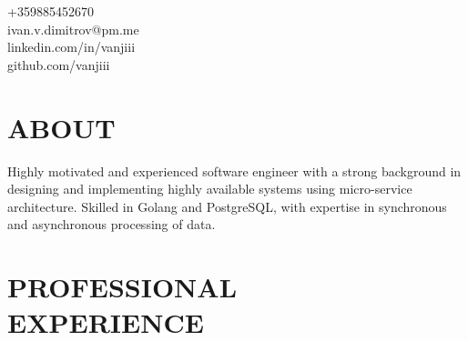 \documentclass[margin,line]{resume}
\begin{document}
{
    \hfill +359885452670				\vspace{0mm}\\\vspace{0mm}%
    \hfill ivan.v.dimitrov@pm.me		\vspace{0mm}\\\vspace{0mm}%
    \hfill linkedin.com/in/vanjiii		\vspace{0mm}\\\vspace{0mm}%
    \hfill github.com/vanjiii			\vspace{0mm}\\\vspace{-10mm}%
}

\begin{resume}

\section{\mysidestyle\textbf{\large{A}\small{BOUT}}}

	Highly motivated and experienced software engineer with a strong background
	in designing and implementing highly available systems using micro-service
	architecture. Skilled in Golang and PostgreSQL, with expertise in
	synchronous and asynchronous processing of data.

\sectionline%

    \section{\mysidestyle\textbf{\large{P}\small{ROFESSIONAL\\EXPERIENCE}}}


\end{resume}
\end{document}
